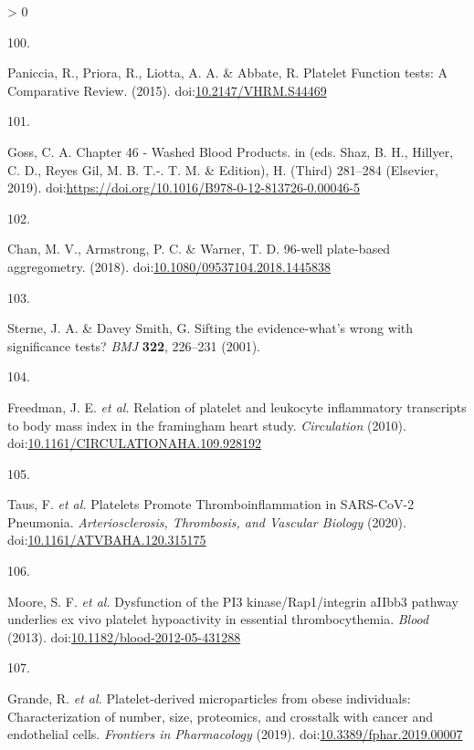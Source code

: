 \documentclass[11pt,twoside]{bristolthesis}
\newlength{\cslhangindent}
\newlength{\csllabelwidth}
\newenvironment{CSLReferences}[2] %
 {%
  \setlength{\parindent}{0pt}
  \ifodd #1 \everypar{\setlength{\hangindent}{\cslhangindent}}\ignorespaces\fi
  \ifnum #2 > 0
  \setlength{\parskip}{#2\baselineskip}
  \fi
 }%
 {}
\newcommand{\CSLLeftMargin}[1]{\parbox[t]{\csllabelwidth}{#1}}
\newcommand{\CSLRightInline}[1]{\parbox[t]{\linewidth - \csllabelwidth}{#1}\break}
\begin{document}
\begin{CSLReferences}{0}{0}
\leavevmode\hypertarget{ref-Paniccia2015}{}%
\CSLLeftMargin{100. }
\CSLRightInline{Paniccia, R., Priora, R., Liotta, A. A. \& Abbate, R. {Platelet Function tests: A Comparative Review}. (2015). doi:\href{https://doi.org/10.2147/VHRM.S44469}{10.2147/VHRM.S44469}}

\leavevmode\hypertarget{ref-Goss2019}{}%
\CSLLeftMargin{101. }
\CSLRightInline{Goss, C. A. {Chapter 46 - Washed Blood Products}. in (eds. Shaz, B. H., Hillyer, C. D., Reyes Gil, M. B. T.-. T. M. \& Edition), H. (Third) 281--284 (Elsevier, 2019). doi:\url{https://doi.org/10.1016/B978-0-12-813726-0.00046-5}}

\leavevmode\hypertarget{ref-Chan2018}{}%
\CSLLeftMargin{102. }
\CSLRightInline{Chan, M. V., Armstrong, P. C. \& Warner, T. D. 96-well plate-based aggregometry. (2018). doi:\href{https://doi.org/10.1080/09537104.2018.1445838}{10.1080/09537104.2018.1445838}}

\leavevmode\hypertarget{ref-Sterne2001}{}%
\CSLLeftMargin{103. }
\CSLRightInline{Sterne, J. A. \& Davey Smith, G. {Sifting the evidence-what's wrong with significance tests?} \emph{BMJ} \textbf{322}, 226--231 (2001).}

\leavevmode\hypertarget{ref-Freedman2010}{}%
\CSLLeftMargin{104. }
\CSLRightInline{Freedman, J. E. \emph{et al.} {Relation of platelet and leukocyte inflammatory transcripts to body mass index in the framingham heart study}. \emph{Circulation} (2010). doi:\href{https://doi.org/10.1161/CIRCULATIONAHA.109.928192}{10.1161/CIRCULATIONAHA.109.928192}}

\leavevmode\hypertarget{ref-Taus2020}{}%
\CSLLeftMargin{105. }
\CSLRightInline{Taus, F. \emph{et al.} {Platelets Promote Thromboinflammation in SARS-CoV-2 Pneumonia}. \emph{Arteriosclerosis, Thrombosis, and Vascular Biology} (2020). doi:\href{https://doi.org/10.1161/ATVBAHA.120.315175}{10.1161/ATVBAHA.120.315175}}

\leavevmode\hypertarget{ref-Moore2013}{}%
\CSLLeftMargin{106. }
\CSLRightInline{Moore, S. F. \emph{et al.} {Dysfunction of the PI3 kinase/Rap1/integrin aIIbb3 pathway underlies ex vivo platelet hypoactivity in essential thrombocythemia}. \emph{Blood} (2013). doi:\href{https://doi.org/10.1182/blood-2012-05-431288}{10.1182/blood-2012-05-431288}}

\leavevmode\hypertarget{ref-Grande2019}{}%
\CSLLeftMargin{107. }
\CSLRightInline{Grande, R. \emph{et al.} {Platelet-derived microparticles from obese individuals: Characterization of number, size, proteomics, and crosstalk with cancer and endothelial cells}. \emph{Frontiers in Pharmacology} (2019). doi:\href{https://doi.org/10.3389/fphar.2019.00007}{10.3389/fphar.2019.00007}}


\end{CSLReferences}
\end{document}
